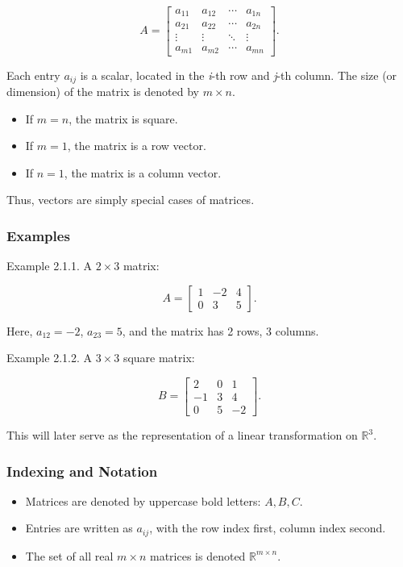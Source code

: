 \documentclass[
  12pt,
  a4paper,
]{article}
\begin{document}
\[A =
\begin{bmatrix}
a_{11} & a_{12} & \cdots & a_{1n} \\
a_{21} & a_{22} & \cdots & a_{2n} \\
\vdots & \vdots & \ddots & \vdots \\
a_{m1} & a_{m2} & \cdots & a_{mn}
\end{bmatrix}.\]

Each entry \(a_{ij}\) is a scalar, located in the \emph{i}-th row and
\emph{j}-th column. The size (or dimension) of the matrix is denoted by
\(m \times n\).

\begin{itemize}
\item
  If \(m = n\), the matrix is square.
\item
  If \(m = 1\), the matrix is a row vector.
\item
  If \(n = 1\), the matrix is a column vector.
\end{itemize}

Thus, vectors are simply special cases of matrices.

\subsubsection{Examples}\label{examples}

Example 2.1.1. A \(2 \times 3\) matrix:

\[A = \begin{bmatrix}
1 & -2 & 4 \\
0 & 3 & 5
\end{bmatrix}.\]

Here, \(a_{12} = -2\), \(a_{23} = 5\), and the matrix has 2 rows, 3
columns.

Example 2.1.2. A \(3 \times 3\) square matrix:

\[B = \begin{bmatrix}
2 & 0 & 1 \\
-1 & 3 & 4 \\
0 & 5 & -2
\end{bmatrix}.\]

This will later serve as the representation of a linear transformation
on \(\mathbb{R}^3\).

\subsubsection{Indexing and Notation}\label{indexing-and-notation}

\begin{itemize}
\item
  Matrices are denoted by uppercase bold letters: \(A, B, C\).
\item
  Entries are written as \(a_{ij}\), with the row index first, column
  index second.
\item
  The set of all real \(m \times n\) matrices is denoted
  \(\mathbb{R}^{m \times n}\).
\end{itemize}
\end{document}
